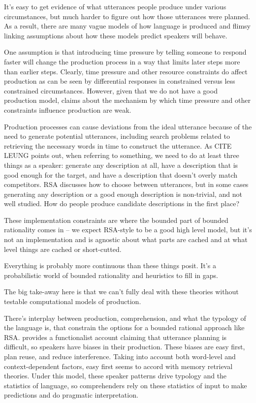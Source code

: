 \documentclass[]{article}
\begin{document}
It's easy to get evidence of what utterances people produce under various circumstances, but much harder to figure out how those utterances were planned. As a result, there are many vague models of how language is produced and flimsy linking assumptions about how these models predict speakers will behave. 

One assumption is that introducing time pressure by telling someone to respond faster will change the production process in a way that limits later steps more than earlier steps. Clearly, time pressure and other resource constraints do affect production as can be seen by differential responses in constrained versus less constrained circumstances. However, given that we do not have a good production model, claims about the mechanism by which time pressure and other constraints influence production are weak.

Production processes can cause deviations from the ideal utterance because of the need to generate potential utterances, including search problems related to retrieving the necessary words in time to construct the utterance. As CITE LEUNG points out, when referring to something, we need to do at least three things as a speaker: generate any description at all, have a description that is good enough for the target, and have a description that doesn't overly match competitors. RSA discusses how to choose between utterances, but in some cases generating any description or a good enough description is non-trivial, and not well studied. How do people produce candidate descriptions in the first place? 



These implementation constraints are where the bounded part of bounded rationality comes in -- we expect RSA-style to be a good high level model, but it's not an implementation and is agnostic about what parts are cached and at what level things are cached or short-cutted. 

Everything is probably more continuous than these things posit. It's a probabilistic world of bounded rationality and heuristics to fill in gaps. 

The big take-away here is that we can't fully deal with these theories without testable computational models of production. %

There's interplay between production, comprehension, and what the typology of the language is, that constrain the options for a bounded rational approach like RSA. \cite{macdonald2013} provides a functionalist account claiming that utterance planning is difficult, so speakers have biases in their production. These biases are easy first, plan reuse, and reduce interference. Taking into account both word-level and context-dependent factors, easy first seems to accord with memory retrieval theories. %
Under this model, these speaker patterns drive typology and the statistics of language, so comprehenders rely on these statistics of input to make predictions and do pragmatic interpretation. 
\end{document}
